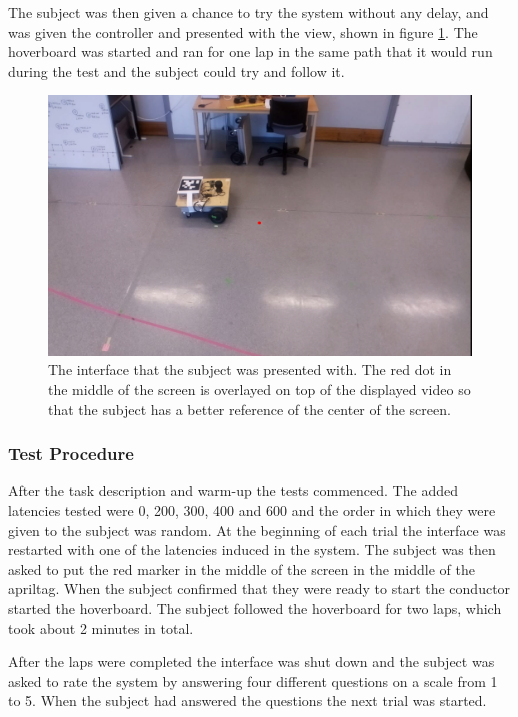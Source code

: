 \documentclass[nofilelist]{cslthse-msc}
\begin{document}
The subject was then given a chance to try the system without any delay, and was given the controller and presented with the view, shown in figure \ref{fig:interface}. The hoverboard was started and ran for one lap in the same path that it would run during the test and the subject could try and follow it.

\begin{figure}[!hbt]
   \centering
   \includegraphics[scale=0.3]{images/interface.png} 
   \caption{The interface that the subject was presented with. The red dot in the middle of the screen is overlayed on top of the displayed video so that the subject has a better reference of the center of the screen.}
   \label{fig:interface}
\end{figure}

\subsubsection{Test Procedure}
After the task description and warm-up the tests commenced. The added latencies tested were 0, 200, 300, 400 and 600 and the order in which they were given to the subject was random. 
At the beginning of each trial the interface was restarted with one of the latencies induced in the system. The subject was then asked to put the red marker in the middle of the screen in the middle of the apriltag. When the subject confirmed that they were ready to start the conductor started the hoverboard. The subject followed the hoverboard for two laps, which took about 2 minutes in total.

After the laps were completed the interface was shut down and the subject was asked to rate the system by answering four different questions on a scale from 1 to 5. When the subject had answered the questions the next trial was started.
\end{document}
